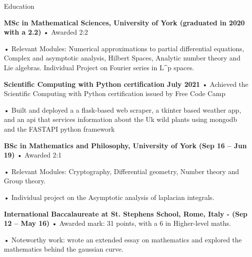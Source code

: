 \documentclass{article}
\begin{document}
\begin{section}
Education
\begin{subsection}

  \textbf{MSc in Mathematical Sciences, University of York (graduated in 2020 with a 2.2)}
  • Awarded 2:2\par
  • Relevant Modules: Numerical approximations to partial differential equations, Complex and
  asymptotic analysis, Hilbert Spaces, Analytic number theory and Lie algebras. Individual Project
  on Fourier series in L^p spaces.
\end{subsection}


\begin{subsection}
  \textbf{Scientific Computing with Python certification July 2021}
• Achieved the Scientific Computing with Python certification issued by Free Code Camp\par
• Built and deployed a a flask-based web scraper, a tkinter based weather app, and an api that
services information about the Uk wild plants using mongodb and the FASTAPI python framework
\end{subsection}


\begin{subsection}
  \textbf{BSc in Mathematics and Philosophy, University of York (Sep 16 – Jun 19)}
• Awarded 2:1\par
• Relevant Modules: Cryptography, Differential geometry, Number theory and Group theory.\par
• Individual project on the Asymptotic analysis of laplacian integrals.
\end{subsection}

\begin{subsection}
  \textbf{International Baccalaureate at St. Stephens School, Rome, Italy - (Sep 12 – May 16)}
• Awarded mark: 31 points, with a 6 in Higher-level maths.\par
• Noteworthy work: wrote an extended essay on mathematics and explored the mathematics behind
the gaussian curve.
\end{subsection}


\end{section}
\end{document}
